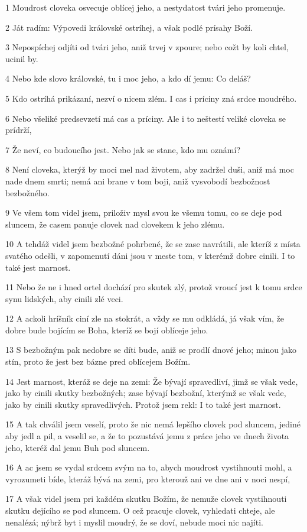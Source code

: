 \par 1 Moudrost cloveka osvecuje oblícej jeho, a nestydatost tvári jeho promenuje.
\par 2 Ját radím: Výpovedi královské ostríhej, a však podlé prísahy Boží.
\par 3 Nepospíchej odjíti od tvári jeho, aniž trvej v zpoure; nebo cožt by koli chtel, ucinil by.
\par 4 Nebo kde slovo královské, tu i moc jeho, a kdo dí jemu: Co deláš?
\par 5 Kdo ostríhá prikázaní, nezví o nicem zlém. I cas i príciny zná srdce moudrého.
\par 6 Nebo všeliké predsevzetí má cas a príciny. Ale i to neštestí veliké cloveka se prídrží,
\par 7 Že neví, co budoucího jest. Nebo jak se stane, kdo mu oznámí?
\par 8 Není cloveka, kterýž by moci mel nad životem, aby zadržel duši, aniž má moc nade dnem smrti; nemá ani brane v tom boji, aniž vysvobodí bezbožnost bezbožného.
\par 9 Ve všem tom videl jsem, priloživ mysl svou ke všemu tomu, co se deje pod sluncem, že casem panuje clovek nad clovekem k jeho zlému.
\par 10 A tehdáž videl jsem bezbožné pohrbené, že se zase navrátili, ale kteríž z místa svatého odešli, v zapomenutí dáni jsou v meste tom, v kterémž dobre cinili. I to také jest marnost.
\par 11 Nebo že ne i hned ortel dochází pro skutek zlý, protož vroucí jest k tomu srdce synu lidských, aby cinili zlé veci.
\par 12 A ackoli hríšník ciní zle na stokrát, a vždy se mu odkládá, já však vím, že dobre bude bojícím se Boha, kteríž se bojí oblíceje jeho.
\par 13 S bezbožným pak nedobre se díti bude, aniž se prodlí dnové jeho; minou jako stín, proto že jest bez bázne pred oblícejem Božím.
\par 14 Jest marnost, kteráž se deje na zemi: Že bývají spravedliví, jimž se však vede, jako by cinili skutky bezbožných; zase bývají bezbožní, kterýmž se však vede, jako by cinili skutky spravedlivých. Protož jsem rekl: I to také jest marnost.
\par 15 A tak chválil jsem veselí, proto že nic nemá lepšího clovek pod sluncem, jediné aby jedl a pil, a veselil se, a že to pozustává jemu z práce jeho ve dnech života jeho, kteréž dal jemu Buh pod sluncem.
\par 16 A ac jsem se vydal srdcem svým na to, abych moudrost vystihnouti mohl, a vyrozumeti bíde, kteráž bývá na zemi, pro kterouž ani ve dne ani v noci nespí,
\par 17 A však videl jsem pri každém skutku Božím, že nemuže clovek vystihnouti skutku dejícího se pod sluncem. O cež pracuje clovek, vyhledati chteje, ale nenalézá; nýbrž byt i myslil moudrý, že se doví, nebude moci nic najíti.

